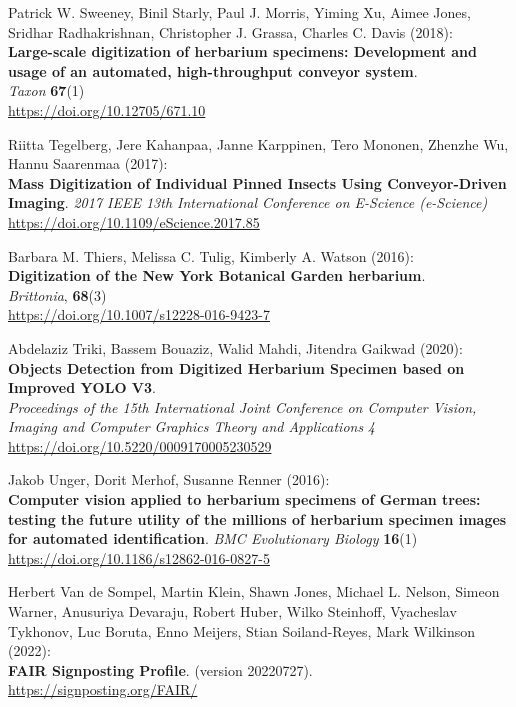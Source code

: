 \begin{thebibliography}{9}
Patrick W. Sweeney, Binil Starly, Paul J. Morris, Yiming Xu, Aimee Jones, Sridhar Radhakrishnan, Christopher J. Grassa, Charles C. Davis (2018):\\
\textbf{Large-scale digitization of herbarium specimens: Development and usage of an
automated, high-throughput conveyor system}.\\
\emph{Taxon} \textbf{67}(1)\\
\url{https://doi.org/10.12705/671.10}

Riitta Tegelberg, Jere Kahanpaa, Janne Karppinen, Tero Mononen, Zhenzhe Wu, Hannu Saarenmaa (2017):\\
\textbf{Mass Digitization of Individual Pinned Insects Using Conveyor-Driven Imaging}.
\emph{2017 IEEE 13th International Conference on E-Science (e-Science)}\\
\url{https://doi.org/10.1109/eScience.2017.85}

Barbara M. Thiers, Melissa C. Tulig, Kimberly A. Watson (2016):\\
\textbf{Digitization of the New York Botanical Garden herbarium}.\\
\emph{Brittonia}, \textbf{68}(3)\\
\url{https://doi.org/10.1007/s12228-016-9423-7}

Abdelaziz Triki, Bassem Bouaziz, Walid Mahdi, Jitendra Gaikwad (2020):\\
\textbf{Objects Detection from Digitized Herbarium Specimen based on Improved
YOLO V3}.\\
\emph{Proceedings of the 15th International Joint Conference on Computer Vision, Imaging and Computer Graphics Theory and Applications} 
\emph{4}\\
\url{https://doi.org/10.5220/0009170005230529}

Jakob Unger, Dorit Merhof, Susanne Renner (2016):\\
\textbf{Computer vision applied to
herbarium specimens of German trees: testing the future utility of the
millions of herbarium specimen images for automated identification}. 
\emph{BMC Evolutionary Biology} \textbf{16}(1)
\url{https://doi.org/10.1186/s12862-016-0827-5}

Herbert Van de Sompel, Martin Klein, Shawn
Jones, Michael L. Nelson, Simeon Warner, Anusuriya Devaraju, Robert
Huber, Wilko Steinhoff, Vyacheslav Tykhonov, Luc Boruta, Enno Meijers,
Stian Soiland-Reyes, Mark Wilkinson (2022):\\
\textbf{FAIR Signposting Profile}. (version 20220727).\\
\url{https://signposting.org/FAIR/}


\end{thebibliography}

